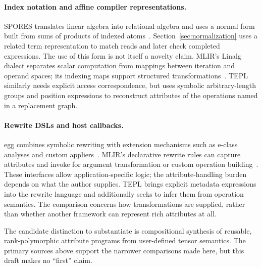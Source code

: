 \paragraph{Index notation and affine compiler representations.}
SPORES translates linear algebra into relational algebra and uses a normal
form built from sums of products of indexed atoms~\cite{spores}.
Section~\ref{sec:normalization} uses a related term representation to match
reads and later check completed expressions. The use of this form is not
itself a novelty claim. MLIR's Linalg dialect separates scalar computation
from mappings between iteration and operand spaces; its indexing maps
support structured transformations~\cite{mlir-linalg}. TEPL similarly needs
explicit access correspondence, but uses symbolic arbitrary-length groups
and position expressions to reconstruct attributes of the operations named
in a replacement graph. 

\paragraph{Rewrite DSLs and host callbacks.}
egg combines symbolic rewriting with extension mechanisms such as e-class
analyses and custom appliers~\cite{egg,egg-applier}. MLIR's declarative rewrite
rules can capture attributes and invoke  for argument
transformation or custom operation building~\cite{mlir-drr}. These interfaces
allow application-specific logic; the attribute-handling burden depends on
what the author supplies. TEPL brings explicit metadata expressions into
the rewrite language and additionally seeks to infer them from operation
semantics. The comparison concerns how transformations are supplied, rather
than whether another framework can represent rich attributes at all.

The candidate distinction to substantiate is compositional synthesis of
reusable, rank-polymorphic attribute programs from user-defined tensor
semantics. The primary sources above support the narrower comparisons made
here, but this draft makes no ``first'' claim. 
